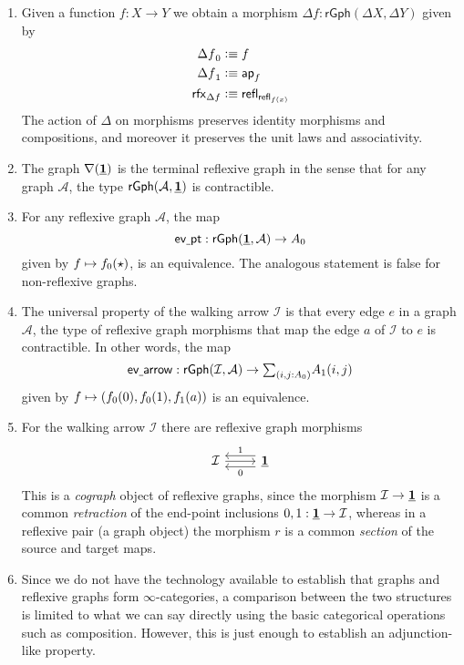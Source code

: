 \begin{eg}\label{eg:rgraph_morphism}
\begin{enumerate}
\item Given a function $f:X\to Y$ we obtain a morphism $\Delta f:\mathsf{rGph}(\Delta X,\Delta Y)$ given by
\begin{align*}
\pts{\Delta f} & \defeq f \\
\edg{\Delta f} & \defeq \apfunc{f} \\
\rfx{\Delta f} & \defeq \refl{\refl{f(x)}}
\end{align*}
The action of $\Delta$ on morphisms preserves identity morphisms and compositions, and moreover it preserves the unit laws and associativity. 
\item The graph $\nabla(\underline{\mathbf{1}})$ is the terminal reflexive graph in the sense that for any graph $\mathcal{A}$, the type $\mathsf{rGph}(\mathcal{A},\underline{\mathbf{1}})$ is contractible.
\item For any reflexive graph $\mathcal{A}$, the map 
\begin{equation*}
\mathsf{ev\usc{}pt}:\mathsf{rGph}(\unit,\mathcal{A})\to\pts{A}
\end{equation*}
given by $f\mapsto \pts{f}(\ttt)$, is an equivalence. The analogous statement is false for non-reflexive graphs.
\item The universal property of the walking arrow $\mathcal{I}$ is that every edge $e$ in a graph $\mathcal{A}$, the type of reflexive graph morphisms that map the edge $a$ of $\mathcal{I}$ to $e$ is contractible. In other words, the map
\begin{equation*}
\mathsf{ev\usc{}arrow} : \mathsf{rGph}(\mathcal{I},\mathcal{A})\to \sm{i,j:\pts{A}}\edg{A}(i,j)
\end{equation*}
given by $f\mapsto (\pts{f}(0),\pts{f}(1),\edg{f}(a))$ is an equivalence.
\item For the walking arrow $\mathcal{I}$ there are reflexive graph morphisms
\begin{equation*}
\begin{tikzcd}
\mathcal{I} \arrow[r] & \unit \arrow[l,yshift=1ex,swap,"1"] \arrow[l,yshift=-1ex,"0"]
\end{tikzcd}
\end{equation*}
This is a \emph{cograph} object of reflexive graphs, since the morphism $\mathcal{I}\to\underline{\mathbf{1}}$ is a common \emph{retraction} of the end-point inclusions $0,1:\underline{\mathbf{1}}\to \mathcal{I}$, whereas in a reflexive pair (a graph object) the morphism $r$ is a common \emph{section} of the source and target maps.
\item \label{eg:freerfx} Since we do not have the technology available to establish that graphs and reflexive graphs form $\infty$-categories, a comparison between the two structures is limited to what we can say directly using the basic categorical operations such as composition. However, this is just enough to establish an adjunction-like property. 


\end{enumerate}
\end{eg}
